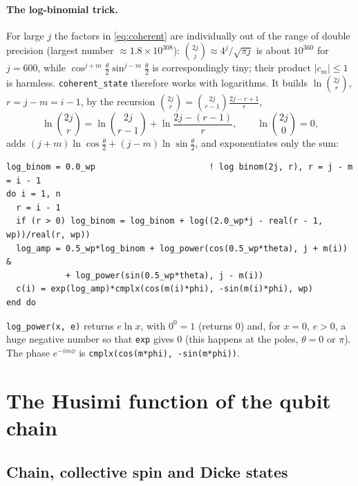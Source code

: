 \documentclass[11pt,a4paper]{article}
\begin{document}
\paragraph{The log-binomial trick.} For large $j$ the factors in \eqref{eq:coherent} are individually out of the range
of double precision (largest number $\approx1.8\times10^{308}$): $\binom{2j}{j}\approx 4^j/\sqrt{\pi j}$ is about
$10^{360}$ for $j = 600$, while $\cos^{j+m}\frac\theta2\sin^{j-m}\frac\theta2$ is correspondingly tiny; their product
$|c_m|\le1$ is harmless. \texttt{coherent\_state} therefore works with logarithms. It builds $\ln\binom{2j}{r}$, $r = j-m
= i-1$, by the recursion $\binom{2j}{r} = \binom{2j}{r-1}\frac{2j-r+1}{r}$,
\begin{equation}\label{eq:logbinom}
  \ln\binom{2j}{r} = \ln\binom{2j}{r-1} + \ln\frac{2j-(r-1)}{r},\qquad \ln\binom{2j}{0} = 0,
\end{equation}
adds $(j+m)\ln\cos\frac\theta2 + (j-m)\ln\sin\frac\theta2$, and exponentiates only the sum:
\begin{lstlisting}
log_binom = 0.0_wp                       ! log binom(2j, r), r = j - m = i - 1
do i = 1, n
  r = i - 1
  if (r > 0) log_binom = log_binom + log((2.0_wp*j - real(r - 1, wp))/real(r, wp))
  log_amp = 0.5_wp*log_binom + log_power(cos(0.5_wp*theta), j + m(i)) &
            + log_power(sin(0.5_wp*theta), j - m(i))
  c(i) = exp(log_amp)*cmplx(cos(m(i)*phi), -sin(m(i)*phi), wp)
end do
\end{lstlisting}
\texttt{log\_power(x, e)} returns $e\ln x$, with $0^0 = 1$ (returns $0$) and, for $x = 0$, $e>0$, a huge negative number
so that \texttt{exp} gives $0$ (this happens at the poles, $\theta = 0$ or $\pi$). The phase $e^{-im\phi}$ is
\lstinline!cmplx(cos(m*phi), -sin(m*phi))!.

\section{The Husimi function of the qubit chain}\label{sec:chain}

\subsection{Chain, collective spin and Dicke states}
\end{document}
